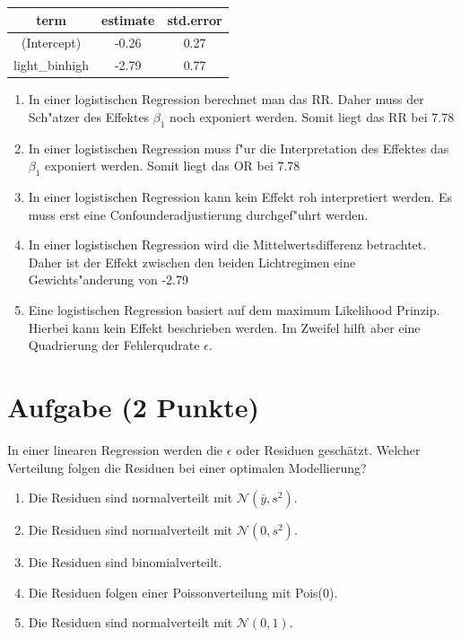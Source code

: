 \documentclass[a4paper, 10pt]{scrartcl}\usepackage[]{graphicx}\usepackage[]{xcolor}
\begin{document}
\begin{table}[!h]
\centering
\begin{tabular}{ccc}
\toprule
term & estimate & std.error\\
\midrule
(Intercept) & -0.26 & 0.27\\
light\_binhigh & -2.79 & 0.77\\
\bottomrule
\end{tabular}
\end{table}





\begin{enumerate}
\item [\textbf{A} \msquare] In einer logistischen Regression berechnet man das RR. Daher muss der Sch{"a}tzer des Effektes $\beta_1$ noch exponiert werden. Somit liegt das RR bei 7.78
\item [\textbf{B} \msquare] In einer logistischen Regression muss f{"u}r die Interpretation des Effektes das $\beta_1$ exponiert werden. Somit liegt das OR bei 7.78
\item [\textbf{C} \msquare] In einer logistischen Regression kann kein Effekt roh interpretiert werden. Es muss erst eine Confounderadjustierung durchgef{"u}hrt werden.
\item [\textbf{D} \msquare] In einer logistischen Regression wird die Mittelwertsdifferenz betrachtet. Daher ist der Effekt zwischen den beiden Lichtregimen eine Gewichts{"a}nderung von -2.79
\item [\textbf{E} \msquare] Eine logistischen Regression basiert auf dem maximum Likelihood Prinzip. Hierbei kann kein Effekt beschrieben werden. Im Zweifel hilft aber eine Quadrierung der Fehlerqudrate $\epsilon$.
\end{enumerate}

\section{Aufgabe \hfill (2 Punkte)}

In einer linearen Regression werden die $\epsilon$ oder Residuen
gesch{\"a}tzt. Welcher Verteilung folgen die Residuen bei einer optimalen
Modellierung? 



\begin{enumerate}
\item [\textbf{A} \msquare] Die Residuen sind normalverteilt mit $\mathcal{N}(\bar{y}, s^2)$.
\item [\textbf{B} \msquare] Die Residuen sind normalverteilt mit $\mathcal{N}(0, s^2)$.
\item [\textbf{C} \msquare] Die Residuen sind binomialverteilt.
\item [\textbf{D} \msquare] Die Residuen folgen einer Poissonverteilung mit Pois(0).
\item [\textbf{E} \msquare] Die Residuen sind normalverteilt mit $\mathcal{N}(0, 1)$.
\end{enumerate}
\end{document}
